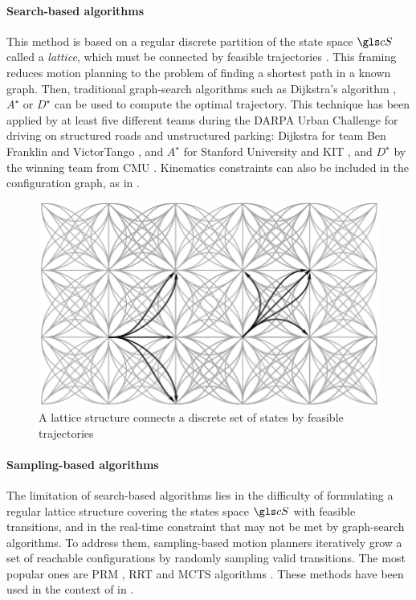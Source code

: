 \paragraph{Search-based algorithms}

This method is based on a regular discrete partition of the state space $\cS$ called a \emph{lattice}, which must be connected by feasible trajectories \citep[\eg][]{Pivtoraiko2005}. This framing reduces motion planning to the problem of finding a shortest path in a known graph. Then, traditional graph-search algorithms such as Dijkstra's algorithm \citep{Dijkstra1959}, $A^\star$ \citep{Hart1968} or $D^\star$ \citep{Stentz1994} can be used to compute the optimal trajectory. This technique has been applied by at least five different teams during the DARPA Urban Challenge for driving on structured roads and unstructured parking: Dijkstra for team Ben Franklin \citep{Bohren2008} and VictorTango \citep{Bacha2008}, and $A^\star$ for Stanford University \citep{Montemerlo2008} and KIT \citep{Kammel2008}, and $D^\star$ by the winning team from CMU \citep{Urmson2008}. Kinematics constraints can also be included in the configuration graph, as in \citep[\eg][]{Latombe1991,Fraichard1993,Laumond1994}.

\begin{figure}[tp]
	\centering
	\includegraphics[width=0.5\linewidth]{img/lattice2}
	\caption{A lattice structure connects a discrete set of states by feasible trajectories}
\end{figure}

\paragraph{Sampling-based algorithms}

The limitation of search-based algorithms lies in the difficulty of formulating a regular lattice structure covering the states space $\cS$ with feasible transitions, and in the real-time constraint that may not be met by graph-search algorithms. To address them, sampling-based motion planners iteratively grow a set of reachable configurations by randomly sampling valid transitions. The most popular ones are \gls{PRM} \citep{Kavraki1996}, \gls{RRT} \citep{Lavalle98,Karaman2011} and \gls{MCTS} algorithms \citep{Coulom2006, Kocsis2006}. These methods have been used in the context of  in \citep[\eg][]{Lamiraux2001,Sanchez2002,Lenz2016,Paxton2017,Faust2018}.

